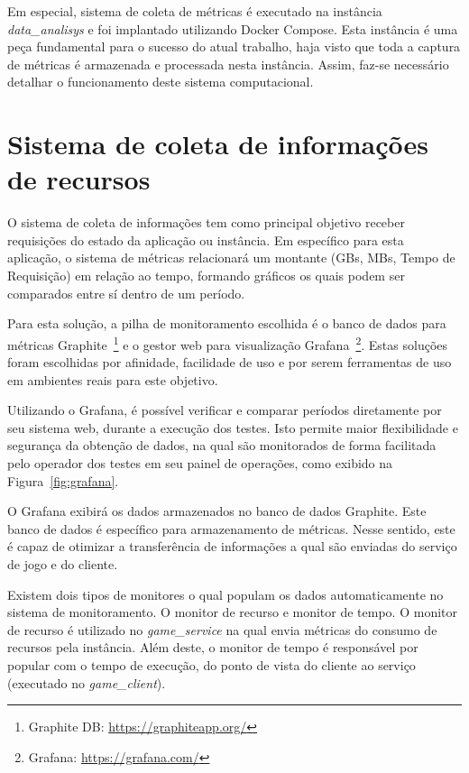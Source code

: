 Em especial, sistema de coleta de métricas é executado na instância \textit{data\_analisys} e foi implantado utilizando Docker Compose.
%
Esta instância é uma peça fundamental para o sucesso do atual trabalho, haja visto que toda a captura de métricas é armazenada e processada nesta instância.
%
Assim, faz-se necessário detalhar o funcionamento deste sistema computacional.


\section{Sistema de coleta de informações de recursos}
\label{sec:informacoes}

O sistema de coleta de informações tem como principal objetivo receber requisições do estado da aplicação ou instância.
%
Em específico para esta aplicação, o sistema de métricas relacionará um montante (GBs, MBs, Tempo de Requisição) em relação ao tempo, formando gráficos os quais podem ser comparados entre sí dentro de um período.

Para esta solução, a pilha de monitoramento escolhida é o banco de dados para métricas Graphite~\footnote{Graphite DB: \url{https://graphiteapp.org/}} e o gestor web para visualização Grafana~\footnote{Grafana: \url{https://grafana.com/}}.
%
Estas soluções foram escolhidas por afinidade, facilidade de uso e por serem ferramentas de uso em ambientes reais para este objetivo.



Utilizando o Grafana, é possível verificar e comparar períodos diretamente por seu sistema web, durante a execução dos testes.
%
Isto permite maior flexibilidade e segurança da obtenção de dados, na qual são monitorados de forma facilitada pelo operador dos testes em seu painel de operações, como exibido na Figura~\ref{fig:grafana}.

O Grafana exibirá os dados armazenados no banco de dados Graphite.
%
Este banco de dados é específico para armazenamento de métricas.
%
Nesse sentido, este é capaz de otimizar a transferência de informações a qual são enviadas do serviço de jogo e do cliente.

Existem dois tipos de monitores o qual populam os dados automaticamente no sistema de monitoramento.
%
O monitor de recurso e monitor de tempo. 
%
O monitor de recurso é utilizado no \textit{game\_service} na qual envia métricas do consumo de recursos pela instância.
%
Além deste, o monitor de tempo é responsável por popular com o tempo de execução, do ponto de vista do cliente ao serviço (executado no \textit{game\_client}).

